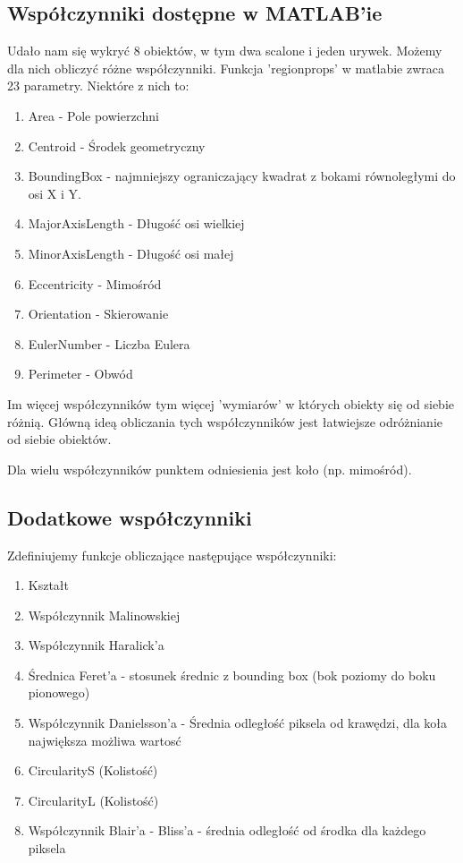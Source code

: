 \documentclass{article}
\begin{document}
	\subsection{Współczynniki dostępne w MATLAB'ie}
	Udało nam się wykryć 8 obiektów, w tym dwa scalone i jeden urywek. Możemy dla nich obliczyć różne współczynniki. Funkcja 'regionprops' w matlabie zwraca 23 parametry. Niektóre z nich to:
	\begin{enumerate}
		\item Area - Pole powierzchni
		\item Centroid - Środek geometryczny
		\item BoundingBox - najmniejszy ograniczający kwadrat z bokami równoległymi do osi X i Y.
		\item MajorAxisLength - Długość osi wielkiej
		\item MinorAxisLength - Długość osi małej
		\item Eccentricity - Mimośród
		\item Orientation - Skierowanie
		\item EulerNumber - Liczba Eulera
		\item Perimeter - Obwód
	\end{enumerate}
	Im więcej współczynników tym więcej 'wymiarów' w których obiekty się od siebie różnią. Główną ideą obliczania tych współczynników jest łatwiejsze odróżnianie od siebie obiektów.
	
	Dla wielu współczynników punktem odniesienia jest koło (np. mimośród).

	\subsection{Dodatkowe współczynniki}
	Zdefiniujemy funkcje obliczające następujące współczynniki:
	\begin{enumerate}
		\label{coefficients}
		\item Kształt
		\item Współczynnik Malinowskiej
		\item Współczynnik Haralick'a
		\item Średnica Feret'a
			- stosunek średnic z bounding box (bok poziomy do boku pionowego)
		\item Współczynnik Danielsson'a
			- Średnia odległość piksela od krawędzi, dla koła największa możliwa wartosć
		\item CircularityS (Kolistość)
		\item CircularityL (Kolistość)
		\item Współczynnik Blair'a - Bliss'a
			- średnia odległość od środka dla każdego piksela
		
	\end{enumerate}
\end{document}
